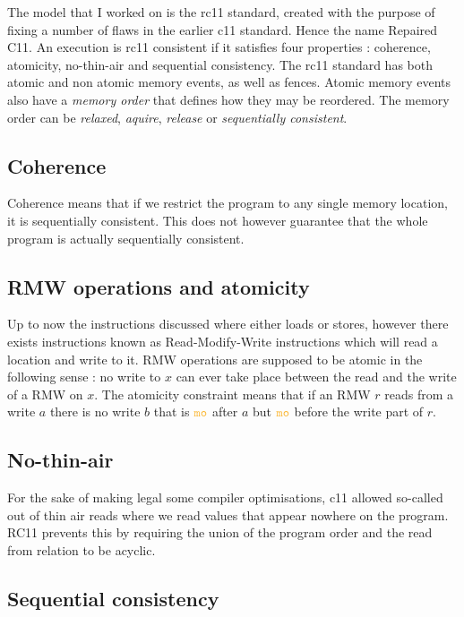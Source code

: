 \documentclass[a4,11pt,dvipsnames]{article}
\begin{document}
The model that I worked on is the rc11\cite{rc11} standard, created with the purpose of fixing a number of flaws in the earlier c11 standard. Hence the name Repaired C11. An execution is rc11 consistent if it satisfies four properties : coherence, atomicity, no-thin-air and sequential consistency. The rc11 standard has both atomic and non atomic memory events, as well as fences. Atomic memory events also have a \emph{memory order} that defines how they may be reordered. The memory order can be \emph{relaxed}, \emph{aquire}, \emph{release} or \emph{sequentially consistent}.

\subsection{Coherence}

Coherence means that if we restrict the program to any single memory location, it is sequentially consistent. This does not however guarantee that the whole program is actually sequentially consistent.

\subsection{RMW operations and atomicity}

Up to now the instructions discussed where either loads or stores, however there exists instructions known as Read-Modify-Write instructions which will read a location and write to it. RMW operations are supposed to be atomic in the following sense : no write to $x$ can ever take place between the read and the write of a RMW on $x$. The atomicity constraint means that if an RMW $r$ reads from a write $a$ there is no write $b$ that is $\mo$ after $a$ but $\mo$ before the write part of $r$.

\subsection{No-thin-air}

For the sake of making legal some compiler optimisations, c11 allowed so-called out of thin air reads where we read values that appear nowhere on the program. RC11 prevents this by requiring the union of the program order and the read from relation to be acyclic.

\subsection{Sequential consistency}
\end{document}
